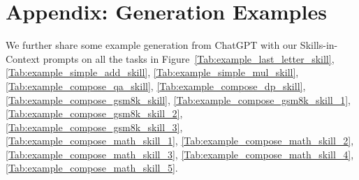 \documentclass{article} %
\begin{document}
\section{Appendix: Generation Examples} \label{Sec:examples}
We further share some example generation from ChatGPT with our Skills-in-Context prompts on all the tasks in Figure~\ref{Tab:example_last_letter_skill},\ref{Tab:example_simple_add_skill}, \ref{Tab:example_simple_mul_skill}, \ref{Tab:example_compose_qa_skill}, \ref{Tab:example_compose_dp_skill}, \ref{Tab:example_compose_gsm8k_skill}, \ref{Tab:example_compose_gsm8k_skill_1}, \ref{Tab:example_compose_gsm8k_skill_2}, \ref{Tab:example_compose_gsm8k_skill_3}, \ref{Tab:example_compose_math_skill_1}, \ref{Tab:example_compose_math_skill_2}, \ref{Tab:example_compose_math_skill_3}, \ref{Tab:example_compose_math_skill_4}, \ref{Tab:example_compose_math_skill_5}.
\end{document}

